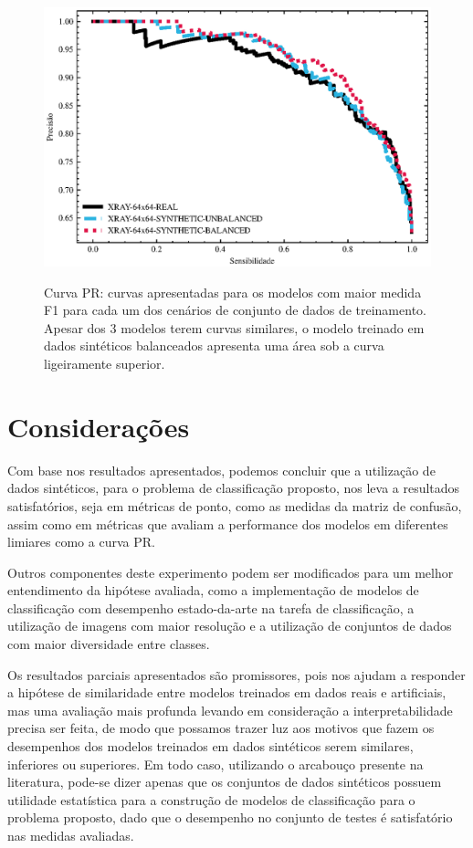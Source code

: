 \begin{figure}[htbp]
	\centering
	\caption[Curva PR]{Curva PR: curvas apresentadas para os modelos com maior medida F1 para cada um dos cenários de conjunto de dados de treinamento. Apesar dos 3 modelos terem curvas similares, o modelo treinado em dados sintéticos balanceados apresenta uma área sob a curva ligeiramente superior.}
		\includegraphics[scale=1]{imagens/experimento-prcurve.eps}
	\label{fig:experimento-pr}
\end{figure}

\section{Considerações}

Com base nos resultados apresentados, podemos concluir que a utilização de dados sintéticos, para o problema de classificação proposto, nos leva a resultados satisfatórios, seja em métricas de ponto, como as medidas da matriz de confusão, assim como em métricas que avaliam a performance dos modelos em diferentes limiares como a curva PR.

Outros componentes deste experimento podem ser modificados para um melhor entendimento da hipótese avaliada, como a implementação de modelos de classificação com desempenho estado-da-arte na tarefa de classificação, a utilização de imagens com maior resolução e a utilização de conjuntos de dados com maior diversidade entre classes.

Os resultados parciais apresentados são promissores, pois nos ajudam a responder a hipótese de similaridade entre modelos treinados em dados reais e artificiais, mas uma avaliação mais profunda levando em consideração a interpretabilidade precisa ser feita, de modo que possamos trazer luz aos motivos que fazem os desempenhos dos modelos treinados em dados sintéticos serem similares, inferiores ou superiores. Em todo caso, utilizando o arcabouço presente na literatura, pode-se dizer apenas que os conjuntos de dados sintéticos possuem utilidade estatística para a construção de modelos de classificação para o problema proposto, dado que o desempenho no conjunto de testes é satisfatório nas medidas avaliadas.

